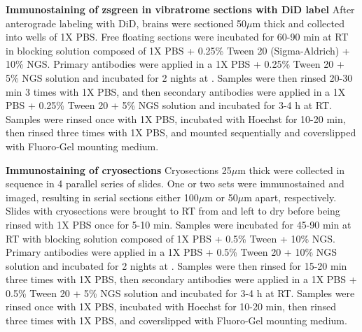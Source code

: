 \textbf{Immunostaining of zsgreen in vibratrome sections with DiD label} \newline
After anterograde labeling with DiD, brains were sectioned 50$\mu$m thick and collected into wells of 1X PBS.
Free floating sections were incubated for 60-90 min at RT in blocking solution composed of 1X PBS + 0.25\% Tween 20 (Sigma-Aldrich) + 10\% NGS.
Primary antibodies were applied in a 1X PBS + 0.25\% Tween 20 + 5\% NGS solution and incubated for 2 nights at .
Samples were then rinsed 20-30 min 3 times with 1X PBS, and then secondary antibodies were applied in a 1X PBS + 0.25\% Tween 20 + 5\% NGS solution and incubated for 3-4 h at RT.
Samples were rinsed once with 1X PBS, incubated with Hoechst for 10-20 min, then rinsed three times with 1X PBS, and mounted sequentially and coverslipped with Fluoro-Gel mounting medium.

\textbf{Immunostaining of cryosections} \newline
Cryosections 25$\mu$m thick were collected in sequence in 4 parallel series of slides.
One or two sets were immunostained and imaged, resulting in serial sections either 100$\mu$m or 50$\mu$m apart, respectively.
Slides with cryosections were brought to RT from  and left to dry before being rinsed with 1X PBS once for 5-10 min.
Samples were incubated for 45-90 min at RT with blocking solution composed of 1X PBS + 0.5\% Tween + 10\% NGS.
Primary antibodies were applied in a 1X PBS + 0.5\% Tween 20 + 10\% NGS solution and incubated for 2 nights at .
Samples were then rinsed for 15-20 min three times with 1X PBS, then secondary antibodies were applied in a 1X PBS + 0.5\% Tween 20 + 5\% NGS solution and incubated for 3-4 h at RT.
Samples were rinsed once with 1X PBS, incubated with Hoechst for 10-20 min, then rinsed three times with 1X PBS, and coverslipped with Fluoro-Gel mounting medium.